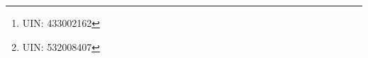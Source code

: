 %


\author{%
  Shao-Ting Chiu\thanks{UIN: 433002162} \\
  Department of Electrical and Computer Engineering\\
  Texas A\&M University\\
  College Station, TX 77843 \\
  \texttt{stchiu@tamu.edu} \\
  Chan-Min Hsu\thanks{UIN: 532008407} \\
  Department of Electrical and Computer Engineering\\
  Texas A\&M University\\
  College Station, TX 77843 \\
  \texttt{chanminhsu@tamu.edu} \\
}